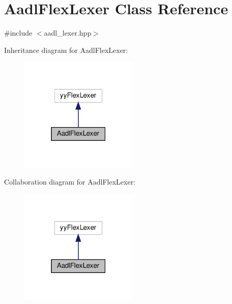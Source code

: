 \hypertarget{classAadlFlexLexer}{}\section{Aadl\+Flex\+Lexer Class Reference}
\label{classAadlFlexLexer}


{\ttfamily \#include $<$aadl\+\_\+lexer.\+hpp$>$}



Inheritance diagram for Aadl\+Flex\+Lexer\+:
\nopagebreak
\begin{figure}[H]
\begin{center}
\leavevmode
\includegraphics[width=159pt]{da/d0e/classAadlFlexLexer__inherit__graph}
\end{center}
\end{figure}


Collaboration diagram for Aadl\+Flex\+Lexer\+:
\nopagebreak
\begin{figure}[H]
\begin{center}
\leavevmode
\includegraphics[width=159pt]{d0/d02/classAadlFlexLexer__coll__graph}
\end{center}
\end{figure}
